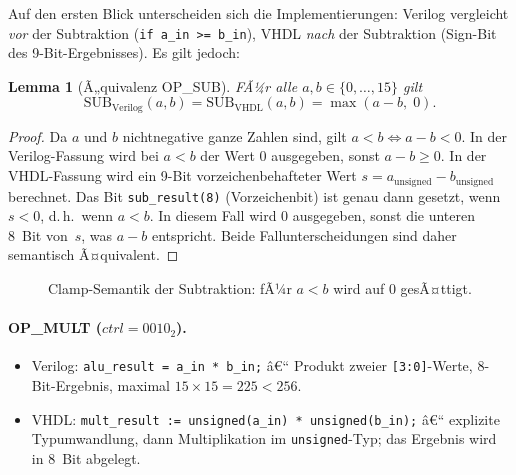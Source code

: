 ﻿\documentclass[12pt,a4paper]{report}
\newtheorem{lemma}[theorem]{Lemma}
\begin{document}
Auf den ersten Blick unterscheiden sich die Implementierungen: Verilog vergleicht
\emph{vor} der Subtraktion (\texttt{if a\_in >= b\_in}), VHDL \emph{nach} der
Subtraktion (Sign-Bit des 9-Bit-Ergebnisses).  Es gilt jedoch:

\begin{lemma}[Ã„quivalenz OP\_SUB]
	\label{lem:sub_equiv}
	FÃ¼r alle $a, b \in \{0,\ldots,15\}$ gilt
	\[
	\mathrm{SUB}_\mathrm{Verilog}(a,b)
	= \mathrm{SUB}_\mathrm{VHDL}(a,b)
	= \max(a - b,\; 0).
	\]
\end{lemma}
\begin{proof}
	Da $a$ und $b$ nichtnegative ganze Zahlen sind, gilt $a < b
	\Leftrightarrow a - b < 0$.  In der Verilog-Fassung wird bei $a < b$ der Wert
	0 ausgegeben, sonst $a - b \geq 0$.  In der VHDL-Fassung wird ein 9-Bit vorzeichenbehafteter
	Wert $s = a_\mathrm{unsigned} - b_\mathrm{unsigned}$ berechnet.  Das Bit
	\texttt{sub\_result(8)} (Vorzeichenbit) ist genau dann gesetzt, wenn
	$s < 0$, d.\,h.\ wenn $a < b$.  In diesem Fall wird 0 ausgegeben, sonst die
	unteren 8~Bit von~$s$, was $a - b$ entspricht.  Beide Fallunterscheidungen
	sind daher semantisch Ã¤quivalent.
\end{proof}

\begin{figure}[H]
	\centering
	\caption{Clamp-Semantik der Subtraktion: fÃ¼r $a < b$ wird auf 0 gesÃ¤ttigt.}
\end{figure}

\paragraph{OP\_MULT ($ctrl = 0010_2$).}
\begin{itemize}
	\item Verilog: \texttt{alu\_result = a\_in * b\_in;} â€“
	Produkt zweier \texttt{[3:0]}-Werte, 8-Bit-Ergebnis, maximal $15 \times 15 = 225 < 256$.
	\item VHDL: \texttt{mult\_result := unsigned(a\_in) * unsigned(b\_in);} â€“
	explizite Typumwandlung, dann Multiplikation im \texttt{unsigned}-Typ;
	das Ergebnis wird in 8~Bit abgelegt.
\end{itemize}
\end{document}
